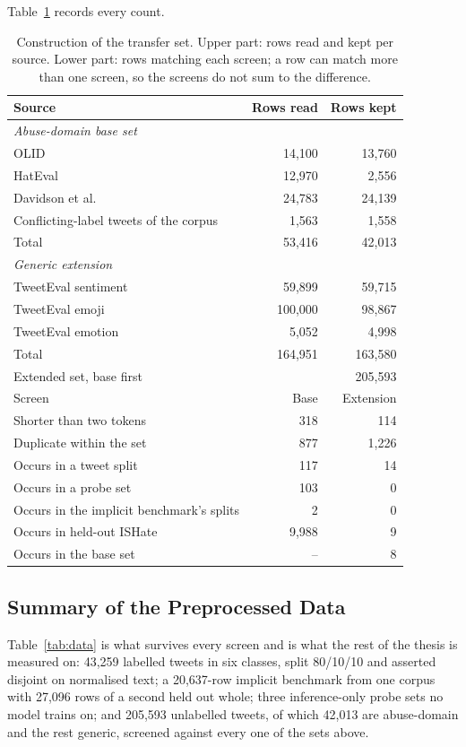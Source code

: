 Table~\ref{tab:transfer} records every count.

\begin{table}[htbp]
\centering
\small
\caption[Construction of the transfer set]{Construction of the transfer set. Upper part: rows read and kept per source. Lower part: rows
matching each screen; a row can match more than one screen, so the screens do not sum to the difference.}
\label{tab:transfer}
\begin{tabular}{lrr}
\toprule
Source & Rows read & Rows kept \\
\midrule
\multicolumn{3}{l}{\emph{Abuse-domain base set}} \\
OLID \cite{zampieri2019olid} & 14,100 & 13,760 \\
HatEval \cite{basile2019hateval} & 12,970 & 2,556 \\
Davidson et al. \cite{davidson2017automated} & 24,783 & 24,139 \\
Conflicting-label tweets of the corpus & 1,563 & 1,558 \\
Total & 53,416 & 42,013 \\
\midrule
\multicolumn{3}{l}{\emph{Generic extension}} \\
TweetEval sentiment & 59,899 & 59,715 \\
TweetEval emoji & 100,000 & 98,867 \\
TweetEval emotion & 5,052 & 4,998 \\
Total & 164,951 & 163,580 \\
\midrule
Extended set, base first & & 205,593 \\
\midrule
Screen & Base & Extension \\
\midrule
Shorter than two tokens & 318 & 114 \\
Duplicate within the set & 877 & 1,226 \\
Occurs in a tweet split & 117 & 14 \\
Occurs in a probe set & 103 & 0 \\
Occurs in the implicit benchmark's splits & 2 & 0 \\
Occurs in held-out ISHate & 9,988 & 9 \\
Occurs in the base set & -- & 8 \\
\bottomrule
\end{tabular}
\end{table}

\subsection{Summary of the Preprocessed Data}
\label{sec:4.summary}
Table~\ref{tab:data} is what survives every screen and is what the rest of the thesis is measured
on: 43,259 labelled tweets in six classes, split 80/10/10 and asserted disjoint on normalised text;
a 20,637-row implicit benchmark from one corpus with 27,096 rows of a second held out whole; three
inference-only probe sets no model trains on; and 205,593 unlabelled tweets, of which 42,013 are
abuse-domain and the rest generic, screened against every one of the sets above.

